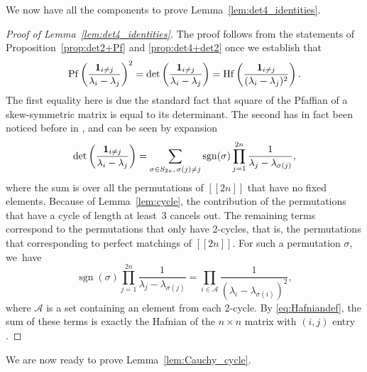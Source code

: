 \documentclass[pdftex]{sigma}
\numberwithin{equation}{section}
\theoremstyle{definition}
\newcommand{\ind}{{\bf{1}}}
\newcommand{\sgn}{\operatorname{sgn}}
\newcommand{\Pf}{\operatorname{Pf}}
\newcommand{\Hf}{\operatorname{Hf}}
\newcommand{\cA}{\mathcal{A}}
\newcommand{\lst}[1]{[\![#1 ]\!]}
\begin{document}
We now have all the components to prove Lemma~\ref{lem:det4_identities}.

\begin{proof}[Proof of Lemma~\ref{lem:det4_identities}]
The proof follows from the statements of Proposition~\ref{prop:det2+Pf} and \ref{prop:det4+det2} once we
establish that
\begin{align*}\label{eq:Pf2=Hf}
 \Pf\left(\frac{\ind_{i\neq j}}{\lambda_i-\lambda_j}\right)^2= \det\left(\frac{\ind_{i\neq j}}{\lambda_i-\lambda_j}\right) = \Hf\left(\frac{\ind_{i\neq j}}{(\lambda_i-\lambda_j)^2}\right).
\end{align*}
The first equality here is due the standard fact that
 square of the Pfaffian of a skew-symmetric matrix is equal to its determinant.
The second has in fact been noticed before in \cite{DSZ}, and can be seen by expansion
\[
 \det\left(\frac{\ind_{i\neq j}}{\lambda_i-\lambda_j}\right)=\sum_{\sigma\in S_{2n},\, \sigma(j)\neq j} \sgn(\sigma) \prod_{j=1}^{2n} \frac{1}{\lambda_j-\lambda_{\sigma(j)}},
\]
where the sum is over all the permutations of $\lst{2n}$ that have no fixed elements. Because of Lemma~\ref{lem:cycle}, the contribution of the permutations that have a cycle of length at least~3 cancels out. The remaining terms correspond to the permutations that only have 2-cycles, that is, the permutations that corresponding to perfect matchings of $\lst{2n}$. For such a permutation $\sigma$, we~have
\[
\sgn(\sigma) \prod_{j=1}^{2n} \frac{1}{\lambda_j-\lambda_{\sigma(j)}}=\prod_{i\in \cA} \frac{1}{(\lambda_{i}-\lambda_{\sigma(i)})^2},
\]
where $\cA$ is a set containing an element from each 2-cycle. By \eqref{eq:Hafniandef}, the sum of these terms is exactly the Hafnian of the $n\times n$ matrix with $(i,j)$ entry \smash{$\frac{\ind_{i\neq j}}{(\lambda_i-\lambda_j)^2}$}.
\end{proof}

We are now ready to prove Lemma~\ref{lem:Cauchy_cycle}.
\end{document}
